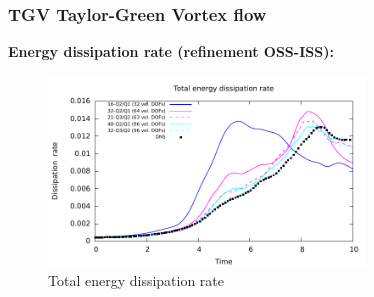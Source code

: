 \begin{frame}
 \frametitle{TGV {\small Taylor-Green Vortex flow}}
 \textbf{Energy dissipation rate (refinement OSS-ISS):}
 \vspace*{-0.1cm}
   \begin{figure}
     \centering	
     \includegraphics[width=0.75\textwidth]{Figures/TGV_OSS_ISS_refinement_tot.pdf}
     \vspace*{-0.3cm}
     \caption{Total energy dissipation rate}
   \end{figure}
 \begin{overlayarea}{\textwidth}{1.5cm}
  \end{overlayarea}
\end{frame}
